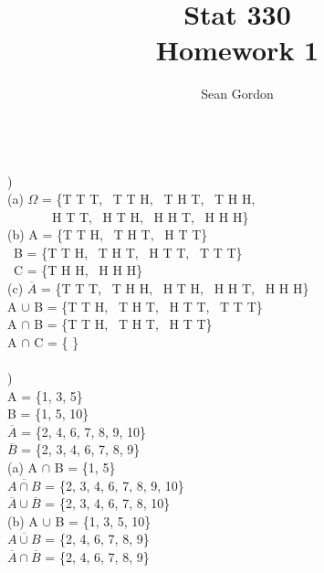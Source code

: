 \documentclass[12pt]{article}
\title{Stat 330\\Homework 1}
\author{Sean Gordon}
\begin{document}
\maketitle


\hrulefill \\


)\\
\indent (a) $\Omega$ = \{T T T, \ T T H, \ T H T, \ T H H,\\ \ \ \
\indent \indent \indent \ \ \ \ H T T, \ H T H, \ H H T, \ H H H\}\\

(b) A = \{T T H, \ T H T, \ H T T\}\\
\indent \indent \ B = \{T T H, \ T H T, \ H T T, \ T T T\}\\
\indent \indent \ C = \{T H H, \ H H H\}\\

(c) $\overline{A}$ = \{T T T, \ T H H, \ H T H, \ H H T, \ H H H\}\\
\indent \indent A $\cup$ B = \{T T H, \ T H T, \ H T T, \ T T T\}\\
\indent \indent A $\cap$ B = \{T T H, \ T H T, \ H T T\}\\
\indent \indent A $\cap$ C = \{ \}\\


\hrulefill \\


)\\
\indent \indent A = \{1, 3, 5\}\\
\indent \indent B = \{1, 5, 10\}\\
\indent \indent $\overline{A}$ = \{2, 4, 6, 7, 8, 9, 10\}\\
\indent \indent $\overline{B}$ = \{2, 3, 4, 6, 7, 8, 9\}\\

(a) A $\cap$ B = \{1, 5\}\\
\indent \indent $\overline{A \cap B}$ = \{2, 3, 4, 6, 7, 8, 9, 10\}\\
\indent \indent $\overline{A} \cup \overline{B}$ = \{2, 3, 4, 6, 7, 8, 10\}\\

(b) A $\cup$ B = \{1, 3, 5, 10\}\\
\indent \indent $\overline{A \cup B}$ = \{2, 4, 6, 7, 8, 9\}\\
\indent \indent $\overline{A} \cap \overline{B}$ = \{2, 4, 6, 7, 8, 9\}\\


\hrulefill \\
\pagebreak
\end{document}
